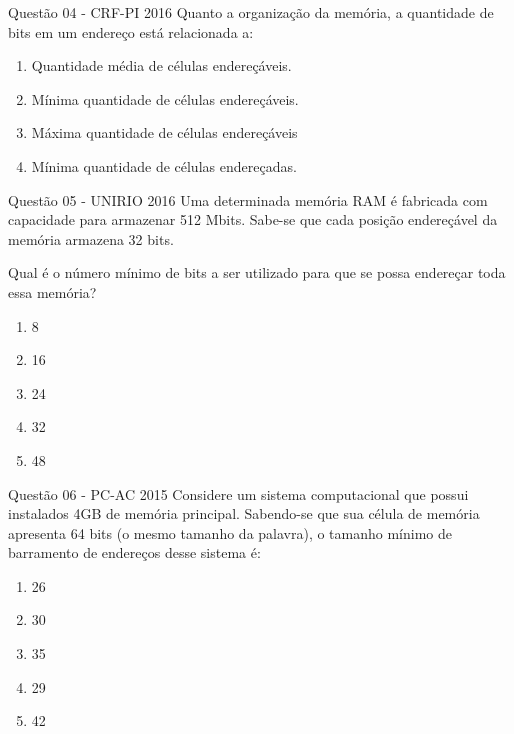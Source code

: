 \documentclass[aspectratio=169,
				xcolor=table]{beamer}
\begin{document}
	\begin{frame}{Questão 04 - CRF-PI 2016}
		Quanto a organização da memória, a quantidade de bits em um endereço está relacionada a:
		\begin{enumerate}[a]
			\item Quantidade média de células endereçáveis.
			\item Mínima quantidade de células endereçáveis. 
			\item Máxima quantidade de células endereçáveis
			\item Mínima quantidade de células endereçadas.			
		\end{enumerate}
	\end{frame}
	
	\begin{frame}{Questão 05 - UNIRIO 2016}
		Uma determinada memória RAM é fabricada com capacidade para armazenar 512 Mbits. Sabe-se que cada posição endereçável da memória armazena 32 bits.
		
		Qual é o número mínimo de bits a ser utilizado para que se possa endereçar toda essa memória? 
		\begin{enumerate}[a]
			\item 8
			\item 16
			\item 24
			\item 32
			\item 48
		\end{enumerate}
	\end{frame}
	
	\begin{frame}{Questão 06 - PC-AC 2015}
		Considere um sistema computacional que possui instalados 4GB de memória principal. Sabendo-se que sua célula de memória apresenta 64 bits (o mesmo tamanho da palavra), o tamanho mínimo de barramento de endereços desse sistema é:
		\begin{enumerate}[a]
			\item 26
			\item 30
			\item 35
			\item 29
			\item 42
		\end{enumerate}
	\end{frame}
\end{document}
